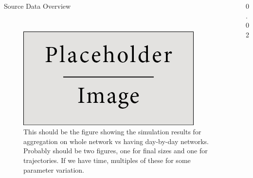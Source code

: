 \documentclass[final]{beamer} %
\newcommand{\spaceProp}{0.02}
\newcommand{\spacer}{\begin{column}{\spaceProp\paperwidth}\end{column}}
\newenvironment{oneCol}{\begin{column}[t]{0.225\paperwidth}}{\end{column}}
\newenvironment{threeCol}{\begin{column}[t]{0.715\paperwidth}}{\end{column}}
\begin{document}
\begin{frame}{}
\begin{columns}[t]
\begin{threeCol}
\begin{block}{Source Data Overview}
\begin{columns}
\begin{oneCol}
\begin{figure}
      \end{figure}   
    \end{oneCol}
    \end{columns}
    \begin{figure}
    \includegraphics[width=0.8\linewidth]{placeholder.jpg}
    \caption{This should be the figure showing the simulation results for aggregation on whole network vs having day-by-day networks.  Probably should be two figures, one for final sizes and one for trajectories.  If we have time, multiples of these for some parameter variation.}
    \end{figure}
    
    \end{block}
    \vfill
    \end{threeCol}
    \spacer{}
    \end{columns}
  \end{frame}
  
\end{document}
